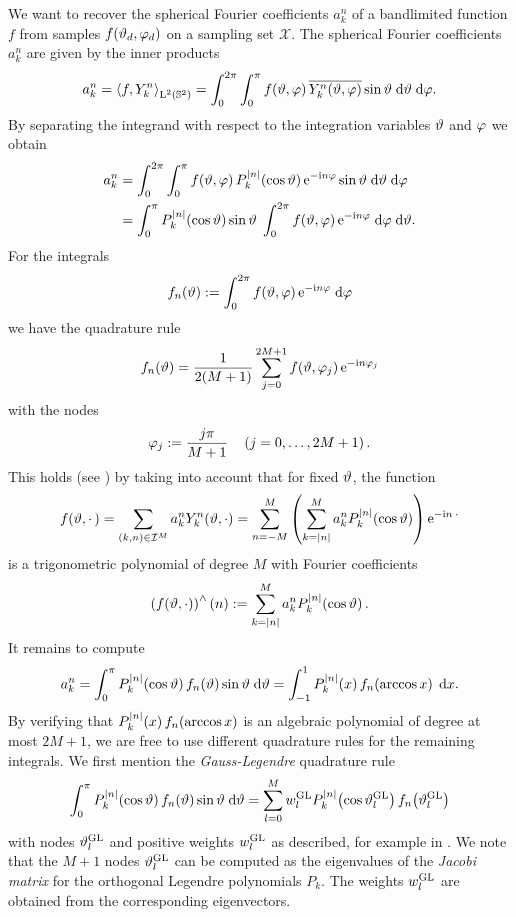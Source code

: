 We want to recover the spherical Fourier coefficients $a_{k}^n$ of a bandlimited function $f$
from samples $f{\hspace{-0.4ex}}\left(\vartheta_{d},\varphi_{d}\right)$ on a sampling set $\mathcal{X}$. 
The spherical Fourier coefficients $a_{k}^n$ are given by the inner products
\[
  a_{k}^n = \left<f,Y_{k}^n\right>_{\text{\rm{L}}^{2}\left(\mathbb{S}^2\right)} = \int_{0}^{2\pi} \int_{0}^{\pi} 
  f{\hspace{-0.4ex}}\left(\vartheta,\varphi\right) \overline{Y_{k}^n{\hspace{-0.4ex}}\left(\vartheta,\varphi\right)} \sin \vartheta 
  \; \text{\rm{d}} \vartheta \; \text{\rm{d}} \varphi.
\]
By separating the integrand with respect to the integration variables $\vartheta$ and $\varphi$ we obtain
\begin{align*}
  a_{k}^n & = \int_{0}^{2\pi} \int_{0}^{\pi} f{\hspace{-0.4ex}}\left(\vartheta,\varphi\right) P_{k}^{\left\vert n\right\vert}{\hspace{-0.4ex}}\left(\cos \vartheta\right) \mbox{\rm{e}}^{-\mbox{\scriptsize\rm{i}} n \varphi} \sin \vartheta \; \text{\rm{d}} \vartheta \; \text{\rm{d}} \varphi\\
          & = \int_{0}^{\pi} P_{k}^{\left\vert n\right\vert}{\hspace{-0.4ex}}\left(\cos \vartheta\right) \sin \vartheta \; \int_{0}^{2\pi} f{\hspace{-0.4ex}}\left(\vartheta,\varphi\right) \mbox{\rm{e}}^{-\mbox{\scriptsize\rm{i}} n \varphi} \; \text{\rm{d}} \varphi \; \text{\rm{d}} \vartheta.
\end{align*}
For the integrals
\[
  f_{n}{\hspace{-0.4ex}}\left(\vartheta\right) := \int_{0}^{2\pi} f{\hspace{-0.4ex}}\left(\vartheta,\varphi\right) \mbox{\rm{e}}^{-\mbox{\scriptsize\rm{i}} n \varphi} \; \text{\rm{d}} \varphi
\]
we have the quadrature rule
\[ 
  f_{n}{\hspace{-0.4ex}}\left(\vartheta\right) = \frac{1}{2(M+1)} \sum_{j=0}^{2M+1} f{\hspace{-0.4ex}}\left(\vartheta,\varphi_{j}\right) \mbox{\rm{e}}^{-\mbox{\scriptsize\rm{i}} n \varphi_{j}}
\]
with the nodes
\[ 
  \varphi_{j} := \frac{j\pi}{M+1} \quad \left(j=0,\ldots,2M+1\right). 
\]
This holds (see \cite[Chapter X]{Zy}) by taking into account that for fixed $\vartheta$, the function
\[
  f{\hspace{-0.4ex}}\left(\vartheta,\cdot\,\right) = \sum_{(k,n) \in \mathcal{I}^M} a_{k}^n
  Y_{k}^n{\hspace{-0.4ex}}\left(\vartheta,\cdot\right) = \sum_{n=-M}^{M} 
  \left(\sum_{k=\left\vert n\right\vert}^M a_{k}^n 
  P_{k}^{\left\vert n\right\vert}{\hspace{-0.4ex}}\left(\cos \vartheta\right)\right) \mbox{\rm{e}}^{-\mbox{\scriptsize\rm{i}} n \: \cdot}
\]
is a trigonometric polynomial of degree $M$ with Fourier coefficients
\[
  \left(f{\hspace{-0.4ex}}\left(\vartheta,\cdot\right)\right)^{\wedge}{\hspace{-0.4ex}}\left(n\right) := \sum_{k=\left\vert n\right\vert}^M a_{k}^n P_{k}^{\left\vert n\right\vert}{\hspace{-0.4ex}}\left(\cos \vartheta\right).
\]
It remains to compute
\[
  a_{k}^n = \int_{0}^{\pi} P_{k}^{\left\vert n\right\vert}{\hspace{-0.4ex}}\left(\cos \vartheta\right) f_{n}{\hspace{-0.4ex}}\left(\vartheta\right) \sin \vartheta \; \text{\rm{d}} \vartheta = 
  \int_{-1}^1 P_{k}^{\left\vert n\right\vert}{\hspace{-0.4ex}}\left(x\right) f_{n}{\hspace{-0.4ex}}\left(\arccos x\right) \; \text{\rm{d}} x.
\]
By verifying that $P_{k}^{\left\vert n\right\vert}{\hspace{-0.4ex}}\left(x\right) f_{n}{\hspace{-0.4ex}}\left(\arccos x\right)$ is an algebraic polynomial of degree at most $2M+1$, 
we are free to use different quadrature rules for the remaining integrals. We 
first mention the \emph{Gauss-Legendre} quadrature rule
\[
  \int_{0}^{\pi} P_{k}^{\left\vert n\right\vert}{\hspace{-0.4ex}}\left(\cos \vartheta\right) f_{n}{\hspace{-0.4ex}}\left(\vartheta\right) \sin \vartheta \; \text{\rm{d}} \vartheta = \sum_{l=0}^{M} w_{l}^{\mbox{\scriptsize\rm{GL}}} P_{k}^{\left\vert n\right\vert}{\hspace{-0.4ex}}\left(\cos \vartheta_{l}^{\mbox{\scriptsize\rm{GL}}}\right) f_{n}{\hspace{-0.4ex}}\left(\vartheta_{l}^{\mbox{\scriptsize\rm{GL}}}\right) 
\]
with nodes $\vartheta_{l}^{\mbox{\scriptsize\rm{GL}}}$ and positive weights $w_{l}^{\mbox{\scriptsize\rm{GL}}}$ as described, for example in \cite{boehme02}. 
We note that the $M+1$ nodes $\vartheta_{l}^{\mbox{\scriptsize\rm{GL}}}$ can be computed as the eigenvalues of the \emph{Jacobi matrix} for the orthogonal 
Legendre polynomials $P_{k}$. The weights $w_{l}^{\mbox{\scriptsize\rm{GL}}}$ are obtained from the corresponding eigenvectors.

